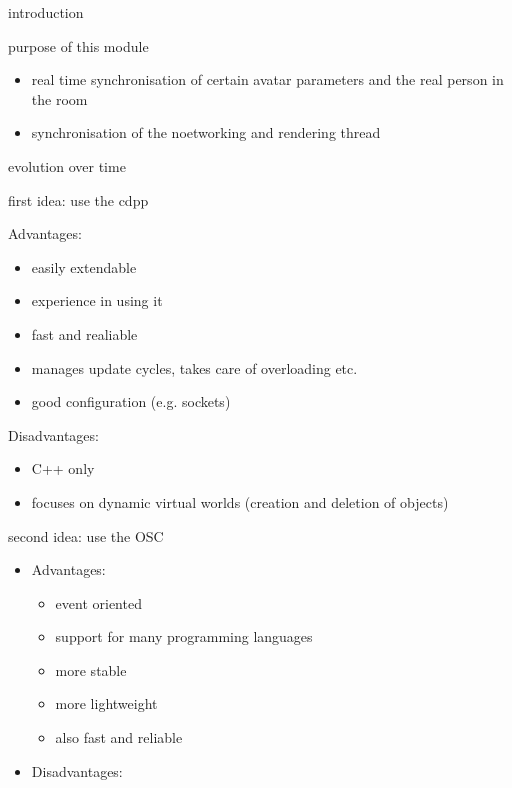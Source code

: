 \documentclass[conference]{acmsiggraph}
\begin{document}
\begin{itemize}
\item introduction
\item{
	purpose of this module
	\begin{itemize}
		\item real time synchronisation of certain avatar parameters and the real person in the room
		\item synchronisation of the noetworking and rendering thread
	\end{itemize}
}
\item{
	evolution over time
	\begin{itemize}
		\item first idea: use the cdpp \cite{goldschwendt13collaborative}
		\item{
			Advantages:
			\begin{itemize}
				\item easily extendable
				\item experience in using it
				\item fast and realiable
				\item manages update cycles, takes care of overloading etc.
				\item good configuration (e.g. sockets)
			\end{itemize}
		}
		\item{
			Disadvantages:
			\begin{itemize}
				\item C++ only
				\item focuses on dynamic virtual worlds (creation and deletion of objects)
			\end{itemize}
		}
		\item {
			\item{
				second idea: use the OSC
				\begin{itemize}
					\item{
						Advantages:
						\begin{itemize}
							\item event oriented
							\item support for many programming languages
							\item more stable
							\item more lightweight
							\item also fast and reliable
						\end{itemize}
					}
					\item{
						Disadvantages:
						\begin{itemize}

\end{itemize}}
\end{itemize}}}
\end{itemize}}
\end{itemize}
\end{document}
